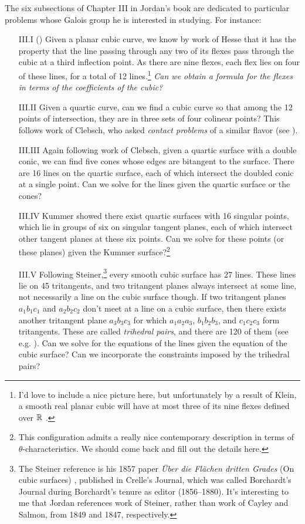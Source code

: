 \documentclass[11pt]{amsart}
\begin{document}
The six subsections of Chapter III in Jordan's book are dedicated to particular problems whose Galois group he is interested in studying. For instance:
\begin{itemize}
    \item[III.I] () Given a planar cubic curve, we know by work of Hesse that it has the property that the line passing through any two of its flexes pass through the cubic at a third inflection point. As there are nine flexes, each flex lies on four of these lines, for a total of 12 lines.\footnote{I'd love to include a nice picture here, but unfortunately by a result of Klein, a smooth real planar cubic will have at most three of its nine flexes defined over $\mathbb{R}$ \cite{Ronga-Klein}.} \emph{Can we obtain a formula for the flexes in terms of the coefficients of the cubic?}

    \item[III.II] Given a quartic curve, can we find a cubic curve so that among the 12 points of intersection, they are in three sets of four colinear points? This follows work of Clebsch, who asked \textit{contact problems} of a similar flavor (see \cite[(429)]{Jordan}).

    \item[III.III] Again following work of Clebsch, given a quartic surface with a double conic, we can find five cones whose edges are bitangent to the surface. There are 16 lines on the quartic surface, each of which intersect the doubled conic at a single point. Can we solve for the lines given the quartic surface or the cones?
    
    \item[III.IV] Kummer showed there exist quartic surfaces with 16 singular points, which lie in groups of six on singular tangent planes, each of which intersect other tangent planes at these six points. Can we solve for these points (or these planes) given the Kummer surface?\footnote{This configuration admits a really nice contemporary description in terms of $\theta$-characteristics. We should come back and fill out the details here.}

    \item[III.V] Following Steiner,\footnote{%
    The Steiner reference is his 1857 paper \textit{Über die Flächen dritten Grades} (On cubic surfaces) \cite{Steiner-cubic-surfaces}, published in Crelle's Journal, which was called Borchardt's Journal during Borchardt's tenure as editor (1856--1880). It's interesting to me that Jordan references work of Steiner, rather than work of Cayley and Salmon, from 1849 and 1847, respectively.} every smooth cubic surface has 27 lines. These lines lie on 45 tritangents, and two tritangent planes always intersect at some line, not necessarily a line on the cubic surface though. If two tritangent planes $a_1b_1c_1$ and $a_2b_2c_2$ don't meet at a line on a cubic surface, then there exists another tritangent plane $a_3b_3c_3$ for which $a_1a_2a_3$, $b_1b_2b_3$, and $c_1c_2c_3$ form tritangents. These are called \textit{trihedral pairs}, and there are 120 of them (see e.g. \cite[p.~112]{Hunt}). Can we solve for the equations of the lines given the equation of the cubic surface? Can we incorporate the constraints imposed by the trihedral pairs?


\end{itemize}
\end{document}
